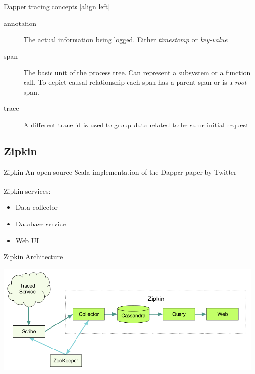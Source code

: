 \begin{frame}{Dapper tracing concepts}
[align left]
\begin{description}
\item[annotation]
The actual information being logged. Either \emph{timestamp} or \emph{key-value}
\item[span]
The basic unit of the process tree. Can represent a subsystem or a function
call. To depict causal relationship each span has a parent span or is a
\emph{root} span.
\item[trace]
A different trace id is used to group data related to he same initial request
\end{description}
\end{frame}

\subsection{Zipkin}

\begin{frame}{Zipkin}
An open-source Scala implementation of the Dapper paper by Twitter
\hfill \\
\hfill \\
Zipkin services:
\begin{itemize}
\item Data collector
\item Database service
\item Web UI
\end{itemize}
\end{frame}

\begin{frame}{Zipkin Architecture}
\begin{center}
    \includegraphics[scale=0.35]{images/zipkin-architecture.png} \\
\end{center}
\end{frame}

